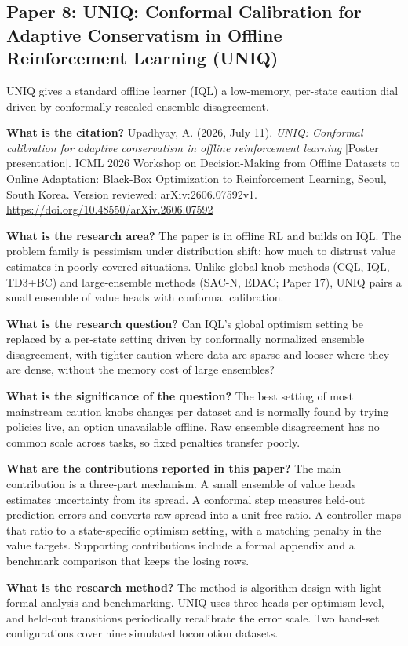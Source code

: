 \documentclass[11pt]{article}
\newcommand{\paper}[1]{\subsection*{#1}}
\newcommand{\q}[2]{\item \textbf{#1} #2}
\begin{document}
\paper{Paper 8: UNIQ: Conformal Calibration for Adaptive Conservatism in Offline Reinforcement Learning (UNIQ)}
UNIQ gives a standard offline learner (IQL) a low-memory, per-state caution dial driven by conformally rescaled ensemble disagreement.
\begin{qna}

\q{What is the citation?}
Upadhyay, A. (2026, July 11). \emph{UNIQ: Conformal calibration for adaptive conservatism in offline reinforcement learning} [Poster presentation]. ICML 2026 Workshop on Decision-Making from Offline Datasets to Online Adaptation: Black-Box Optimization to Reinforcement Learning, Seoul, South Korea. Version reviewed: arXiv:2606.07592v1. \url{https://doi.org/10.48550/arXiv.2606.07592}

\q{What is the research area?}
The paper is in offline RL and builds on IQL. The problem family is pessimism under distribution shift: how much to distrust value estimates in poorly covered situations. Unlike global-knob methods (CQL, IQL, TD3+BC) and large-ensemble methods (SAC-N, EDAC; Paper 17), UNIQ pairs a small ensemble of value heads with conformal calibration.

\q{What is the research question?}
Can IQL's global optimism setting be replaced by a per-state setting driven by conformally normalized ensemble disagreement, with tighter caution where data are sparse and looser where they are dense, without the memory cost of large ensembles?

\q{What is the significance of the question?}
The best setting of most mainstream caution knobs changes per dataset and is normally found by trying policies live, an option unavailable offline. Raw ensemble disagreement has no common scale across tasks, so fixed penalties transfer poorly.

\q{What are the contributions reported in this paper?}
The main contribution is a three-part mechanism. A small ensemble of value heads estimates uncertainty from its spread. A conformal step measures held-out prediction errors and converts raw spread into a unit-free ratio. A controller maps that ratio to a state-specific optimism setting, with a matching penalty in the value targets. Supporting contributions include a formal appendix and a benchmark comparison that keeps the losing rows.

\q{What is the research method?}
The method is algorithm design with light formal analysis and benchmarking. UNIQ uses three heads per optimism level, and held-out transitions periodically recalibrate the error scale. Two hand-set configurations cover nine simulated locomotion datasets.


\end{qna}
\end{document}
